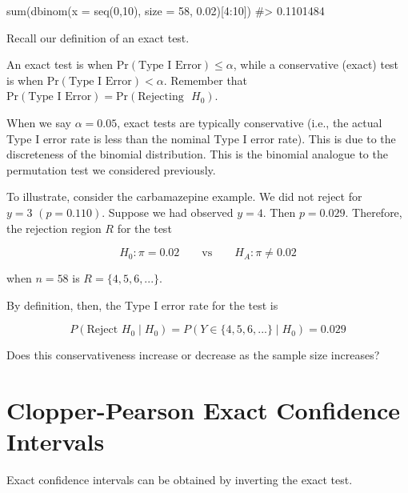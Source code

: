 \documentclass[
  letterpaper,
  DIV=11,
  numbers=noendperiod]{scrreport}
\newenvironment{Shaded}{\begin{snugshade}}{\end{snugshade}}
\newcommand{\AttributeTok}[1]{\textcolor[rgb]{0.40,0.45,0.13}{#1}}
\newcommand{\CommentTok}[1]{\textcolor[rgb]{0.37,0.37,0.37}{#1}}
\newcommand{\DecValTok}[1]{\textcolor[rgb]{0.68,0.00,0.00}{#1}}
\newcommand{\FloatTok}[1]{\textcolor[rgb]{0.68,0.00,0.00}{#1}}
\newcommand{\FunctionTok}[1]{\textcolor[rgb]{0.28,0.35,0.67}{#1}}
\newcommand{\NormalTok}[1]{\textcolor[rgb]{0.00,0.23,0.31}{#1}}
\newcommand{\SpecialCharTok}[1]{\textcolor[rgb]{0.37,0.37,0.37}{#1}}
\begin{document}
\begin{Shaded}
\begin{Highlighting}[]
\FunctionTok{sum}\NormalTok{(}\FunctionTok{dbinom}\NormalTok{(}\AttributeTok{x =} \FunctionTok{seq}\NormalTok{(}\DecValTok{0}\NormalTok{,}\DecValTok{10}\NormalTok{), }\AttributeTok{size =} \DecValTok{58}\NormalTok{, }\FloatTok{0.02}\NormalTok{)[}\DecValTok{4}\SpecialCharTok{:}\DecValTok{10}\NormalTok{])}
\CommentTok{\#\textgreater{} 0.1101484}
\end{Highlighting}
\end{Shaded}

Recall our definition of an exact test.

An exact test is when \(\mathrm{Pr}(\text{Type I Error}) \leq \alpha\),
while a conservative (exact) test is when
\(\mathrm{Pr}(\text{Type I Error}) < \alpha\). Remember that
\(\mathrm{Pr}(\text{Type I Error}) = \mathrm{Pr}(\text{Rejecting } \, \, H_0)\).

When we say \(\alpha = 0.05\), exact tests are typically conservative
(i.e., the actual Type I error rate is less than the nominal Type I
error rate). This is due to the discreteness of the binomial
distribution. This is the binomial analogue to the permutation test we
considered previously.

To illustrate, consider the carbamazepine example. We did not reject for
\(y=3\,\, (p=0.110)\). Suppose we had observed \(y = 4\). Then
\(p = 0.029\). Therefore, the rejection region \(R\) for the test

\[
H_0 \colon \pi = 0.02 \quad \quad \text{vs} \quad \quad H_A \colon \pi \neq 0.02
\]

when \(n = 58\) is \(R = \{ 4, 5, 6, ... \}\).

By definition, then, the Type I error rate for the test is

\[P(\mathrm{Reject }\,\, H_0 \mid H_0) = P(Y \in \{ 4, 5, 6, ... \} \mid H_0 ) = 0.029
\]

Does this conservativeness increase or decrease as the sample size
increases?

\hypertarget{clopper-pearson-exact-confidence-intervals}{%
\section{Clopper-Pearson Exact Confidence
Intervals}\label{clopper-pearson-exact-confidence-intervals}}

Exact confidence intervals can be obtained by inverting the exact test.
\end{document}
